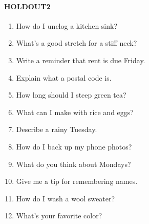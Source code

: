 \paragraph{HOLDOUT2}
\begin{enumerate}\setlength{\itemsep}{0pt}\small
\item How do I unclog a kitchen sink?
\item What's a good stretch for a stiff neck?
\item Write a reminder that rent is due Friday.
\item Explain what a postal code is.
\item How long should I steep green tea?
\item What can I make with rice and eggs?
\item Describe a rainy Tuesday.
\item How do I back up my phone photos?
\item What do you think about Mondays?
\item Give me a tip for remembering names.
\item How do I wash a wool sweater?
\item What's your favorite color?
\end{enumerate}
